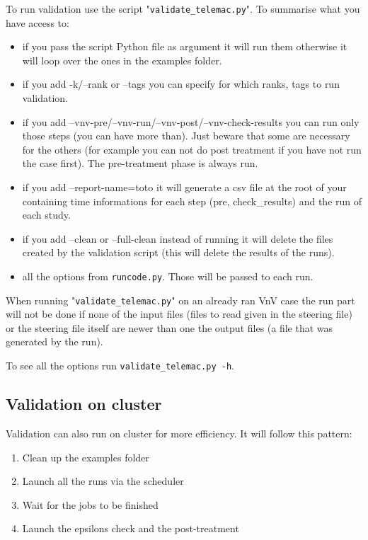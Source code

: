 To run validation use the script "\verb!validate_telemac.py!".
To summarise what you have access to:
\begin{itemize}
\item if you pass the script Python file as argument it will run them otherwise
  it will loop over the ones in the examples folder.
\item if you add -k/--rank or --tags you can specify for which ranks, tags to
  run validation.
\item if you add --vnv-pre/--vnv-run/--vnv-post/--vnv-check-results you can run
only those steps (you can have more than). Just beware that some are necessary
for the others (for example you can not do post treatment if you have not run
the case first). The pre-treatment phase is always run.
\item if you add --report-name=toto it will generate a csv file at the root of
  your \telemacsystem{} containing time informations for each step (pre,
    check\_results) and the run of each study.
\item if you add --clean or --full-clean instead of running it will delete the
  files created by the validation script (this will delete the results of the
    runs).
\item all the options from \verb!runcode.py!. Those will be passed to each run.
\end{itemize}

When running "\verb!validate_telemac.py!" on an already ran VnV case the run
part will not be done if none of the input files (files to read given in the steering file)
or the steering file itself are newer than one the output files (a file that was
generated by the run).

To see all the options run \verb!validate_telemac.py -h!.

\subsection{Validation on cluster}

Validation can also run on cluster for more efficiency.
It will follow this pattern:
\begin{enumerate}
  \item Clean up the examples folder
  \item Launch all the \telma runs via the scheduler
  \item Wait for the jobs to be finished
  \item Launch the epsilons check and the post-treatment
\end{enumerate}

